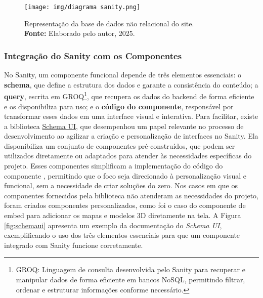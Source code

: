     \begin{figure}[H]
        \centering
        \texttt{[image: img/diagrama sanity.png]}
        \caption{ Representação da base de dados não relacional do site.\\
            \textbf{Fonte:} Elaborado pelo autor, 2025.}
        \label{fig:diagrama sanity}
    \end{figure}

    \subsubsection{Integração do Sanity com os Componentes}
    No Sanity, um componente funcional depende de três elementos essenciais: o \textbf{schema}, que define a estrutura dos dados e garante a consistência do conteúdo; a \textbf{query}, escrita em GROQ\footnote{GROQ: Linguagem de consulta desenvolvida pelo Sanity para recuperar e manipular dados de forma eficiente em bancos NoSQL, permitindo filtrar, ordenar e estruturar informações conforme necessário.}, que recupera os dados do backend de forma eficiente e os disponibiliza para uso; e o \textbf{código do componente}, responsável por transformar esses dados em uma interface visual e interativa.
    Para facilitar, existe a biblioteca \href{https://schemaui.com/docs/}{Schema UI}, que desempenhou um papel relevante no processo de desenvolvimento ao agilizar a criação e personalização de interfaces no Sanity. Ela disponibiliza um conjunto de componentes pré-construídos, que podem ser utilizados diretamente ou adaptados para atender às necessidades específicas do projeto. Esses componentes simplificam a implementação do código do componente , permitindo que o foco seja direcionado à personalização visual e funcional, sem a necessidade de criar soluções do zero. Nos casos em que os componentes fornecidos pela biblioteca não atenderam as necessidades do projeto, foram criados componentes personalizados, como foi o caso do componente de embed para adicionar os mapas e modelos 3D diretamente na tela. A Figura \ref{fig:schemaui} apresenta um exemplo da documentação do \textit{Schema UI}, exemplificando o uso dos três elementos essenciais para que um componente integrado com Sanity funcione corretamente.

